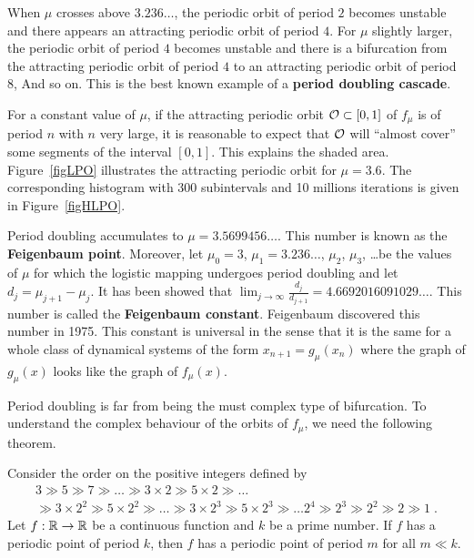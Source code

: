 When $\mu$ crosses above $3.236\ldots$, the periodic orbit of period $2$
becomes unstable and there appears an attracting periodic orbit of
period $4$.  For $\mu$ slightly larger, the periodic orbit of period
$4$ becomes unstable and there is a bifurcation from the attracting
periodic orbit of period $4$ to an attracting periodic orbit of period
$8$, And so on.  This is the best known example of a
{\bfseries period doubling cascade}.

For a constant value of $\mu$, if the attracting periodic orbit
$\mathcal{O} \subset [0,1]$ of $f_\mu$ is of period $n$ with $n$ very large,
it is reasonable to expect that $\mathcal{O}$ will ``almost cover'' some
segments of the interval $[0,1]$.  This explains the shaded area.
Figure~\ref{figLPO} illustrates the attracting periodic orbit for
$\mu=3.6$.  The corresponding histogram with 300 subintervals and 10
millions iterations is given in Figure~\ref{figHLPO}.



Period doubling accumulates to $\mu = 3.5699456\ldots$.  This number
is known as the {\bfseries Feigenbaum point}.  Moreover, let $\mu_0=3$,
$\mu_1=3.236\ldots$, $\mu_2$, $\mu_3$, \ldots be the values of $\mu$
for which the logistic mapping undergoes period doubling and let
$d_j = \mu_{j+1}-\mu_j$.  It has been showed that
$\displaystyle \lim_{j\rightarrow \infty} \frac{d_j}{d_{j+1}} =
4.6692016091029\ldots$.  This number is called the
{\bfseries Feigenbaum constant}.
Feigenbaum discovered this number in
1975.  This constant is universal in the sense that it is the same
for a whole class of dynamical systems of the form
$x_{n+1} = g_\mu(x_n)$ where the graph of $g_\mu(x)$ looks like the
graph of $f_\mu(x)$.

Period doubling is far from being the must complex type of
bifurcation. To understand the complex behaviour of the orbits of
$f_\mu$, we need the following theorem.

\begin{theorem}[Sarkovskii]
Consider the order on the positive integers defined by
\begin{multline*}
3 \gg 5 \gg 7 \gg \ldots
\gg 3\times 2 \gg 5\times 2 \gg \ldots \\
\gg 3\times 2^2 \gg 5\times 2^2 \gg \ldots
\gg 3\times 2^3 \gg 5\times 2^3 \gg \ldots
2^4 \gg 2^3 \gg 2^2 \gg 2 \gg 1 \; .
\end{multline*}
Let $f:\mathbb{R} \rightarrow \mathbb{R}$ be a continuous function and $k$ be a
prime number.  If $f$ has a periodic point of period $k$, then $f$ has
a periodic point of period $m$ for all $m \ll k$.
\end{theorem}

